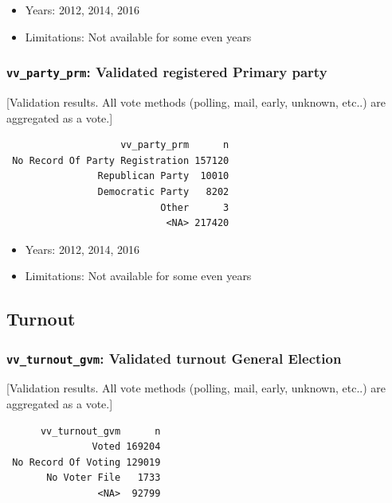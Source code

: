 \documentclass[10pt,article,oneside]{memoir}
\theoremstyle{definition}
\begin{document}
\begin{itemize}
\tightlist
\item
  Years: 2012, 2014, 2016
\item
  Limitations: Not available for some even years
\end{itemize}

\subsubsection{\texorpdfstring{\texttt{vv\_party\_prm}: Validated
registered Primary
party}{vv\_party\_prm: Validated registered Primary party}}\label{vv_party_prm-validated-registered-primary-party}

{[}Validation results. All vote methods (polling, mail, early, unknown,
etc..) are aggregated as a vote.{]}

\begin{verbatim}
                    vv_party_prm      n
 No Record Of Party Registration 157120
                Republican Party  10010
                Democratic Party   8202
                           Other      3
                            <NA> 217420
\end{verbatim}

\begin{itemize}
\tightlist
\item
  Years: 2012, 2014, 2016
\item
  Limitations: Not available for some even years
\end{itemize}

\subsection{Turnout}\label{turnout}

\subsubsection{\texorpdfstring{\texttt{vv\_turnout\_gvm}: Validated
turnout General
Election}{vv\_turnout\_gvm: Validated turnout General Election}}\label{vv_turnout_gvm-validated-turnout-general-election}

{[}Validation results. All vote methods (polling, mail, early, unknown,
etc..) are aggregated as a vote.{]}

\begin{verbatim}
      vv_turnout_gvm      n
               Voted 169204
 No Record Of Voting 129019
       No Voter File   1733
                <NA>  92799
\end{verbatim}
\end{document}
